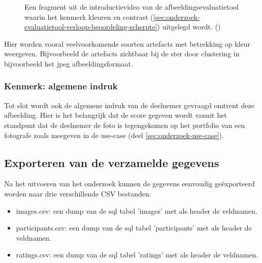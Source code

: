 \begin{figure}[]
	\centering
	\caption{Een fragment uit de introductievideo van de \gls{afbeeldingsevaluatietool} waarin het kenmerk kleuren en contrast (\ref{sec:onderzoek-evaluatietool-verloop-beoordeling-scherpte}) uitgelegd wordt. (\cite{introductievideo})}
	\label{fig:kenmerk-kleuren}
\end{figure}

Hier worden vooral veelvoorkomende soorten \glspl{artefact} met betrekking op kleur weergeven. Bijvoorbeeld de \glspl{artefact} zichtbaar bij de ster door clustering in bijvoorbeeld het \gls{jpeg} \gls{afbeeldingsformaat}.


\subsubsection{Kenmerk: algemene indruk}
\label{sec:onderzoek-evaluatietool-verloop-beoordeling-algemeen}

Tot slot wordt ook de algemene indruk van de deelnemer gevraagd omtrent deze afbeelding. Hier is het belangrijk dat de score gegeven wordt vanuit het standpunt dat de deelnemer de foto is tegengekomen op het portfolio van een fotografe zoals meegeven in de \gls{use-case} (deel \ref{sec:onderzoek-use-case}).

\subsection{Exporteren van de verzamelde gegevens}
\label{sec:onderzoek-evaluatietool-export}

Na het uitvoeren van het onderzoek kunnen de gegevens eenvoudig geëxporteerd worden naar drie verschillende CSV bestanden:

\begin{itemize}
	
	\item images.csv: een dump van de \gls{sql} tabel 'images' met als header de veldnamen.
	
	\item participants.csv: een dump van de \gls{sql} tabel 'participants' met als header de veldnamen.
	
	\item ratings.csv: een dump van de \gls{sql} tabel 'ratings' met als header de veldnamen.
\end{itemize}


